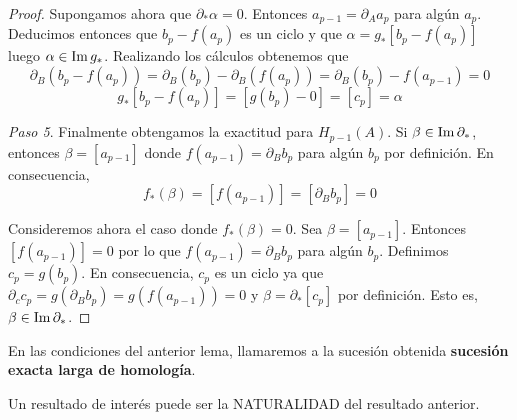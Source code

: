 \begin{proof}
	Supongamos ahora que $\partial_* \alpha = 0$. Entonces $a_{p-1} = \partial_A a_p$ para algún $a_p$. Deducimos entonces que $b_p - f(a_p)$ es un ciclo y que $\alpha = g_*[b_p - f(a_p)]$ luego $\alpha \in \operatorname{Im} g_*$. Realizando los cálculos obtenemos que
	\[
		\partial_B(b_p - f(a_p)) = \partial_B(b_p) - \partial_B(f(a_p)) = \partial_B(b_p) - f(a_{p-1}) = 0
	\]
	\[
		g_*[b_p - f(a_p)] = [g(b_p) - 0] = [c_p] = \alpha
	\]
	
	\textit{Paso 5}. Finalmente obtengamos la exactitud para $H_{p-1}(A)$. Si $\beta \in \operatorname{Im} \partial_*$, entonces $\beta = [a_{p-1}]$ donde $f(a_{p-1}) = \partial_B b_p$ para algún $b_p$ por definición. En consecuencia,
	\[
		f_*(\beta) = [f(a_{p-1})] = [\partial_B b_p] = 0
	\]
	
	Consideremos ahora el caso donde $f_*(\beta) = 0$. Sea $\beta = [a_{p-1}]$. Entonces $[f(a_{p-1})] = 0$ por lo que $f(a_{p-1}) = \partial_B b_p$ para algún $b_p$. Definimos $c_p = g(b_p)$. En consecuencia, $c_p$ es un ciclo ya que $\partial_c c_p = g(\partial_B b_p) = g(f(a_{p-1})) = 0$ y $\beta = \partial_* [c_p]$ por definición. Esto es, $\beta \in \operatorname{Im} \partial_*$.
\end{proof}
\begin{definicion}
	En las condiciones del anterior lema, llamaremos a la sucesión obtenida \textbf{sucesión exacta larga de homología}.
\end{definicion}
Un resultado de interés puede ser la NATURALIDAD del resultado anterior.

